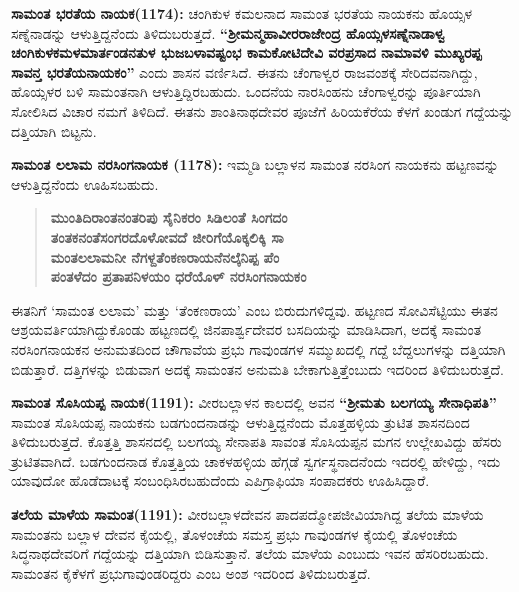 \textbf{ಸಾಮಂತ ಭರತೆಯ ನಾಯಕ(1174):} ಚಂಗಿಕುಳ ಕಮಲನಾದ ಸಾಮಂತ ಭರತೆಯ ನಾಯಕನು ಹೊಯ್ಸಳ ಸಣ್ನೆನಾಡನ್ನು ಆಳುತ್ತಿದ್ದನೆಂದು ತಿಳಿದುಬರುತ್ತದೆ. \textbf{“ಶ‍್ರೀಮನ್ಮಹಾವೀರರಾಜೇಂದ್ರ ಹೊಯ್ಸಳಸಣ್ನೆನಾಡಾಳ್ವ ಚಂಗಿಕುಳಕಮಳಮಾರ್ತಂಡನತುಳ ಭುಜಬಳಾವಷ್ಟಂಭ ಕಾಮಕೋಟಿದೇವಿ ವರಪ್ರಸಾದ ನಾಮಾವಳಿ ಮುಖ್ಯರಪ್ಪ ಸಾವನ್ತ ಭರತೆಯನಾಯಕಂ”} ಎಂದು ಶಾಸನ ವರ್ಣಿಸಿದೆ. ಈತನು ಚೆಂಗಾಳ್ವರ ರಾಜವಂಶಕ್ಕೆ ಸೇರಿದವನಾಗಿದ್ದು, ಹೊಯ್ಸಳರ ಬಳಿ ಸಾಮಂತನಾಗಿ ಆಳುತ್ತಿದ್ದಿರಬಹುದು. ಒಂದನೆಯ ನಾರಸಿಂಹನು ಚೆಂಗಾಳ್ವರನ್ನು ಪೂರ್ತಿಯಾಗಿ ಸೋಲಿಸಿದ ವಿಚಾರ ನಮಗೆ ತಿಳಿದಿದೆ. ಈತನು ಶಾಂತಿನಾಥದೇವರ ಪೂಜೆಗೆ ಹಿರಿಯಕೆರೆಯ ಕೆಳಗೆ ಖಂಡುಗ ಗದ್ದೆಯನ್ನು ದತ್ತಿಯಾಗಿ ಬಿಟ್ಟನು.

\textbf{ಸಾಮಂತ ಲಲಾಮ ನರಸಿಂಗನಾಯಕ (1178):} ಇಮ್ಮಡಿ ಬಲ್ಲಾಳನ ಸಾಮಂತ ನರಸಿಂಗ ನಾಯಕನು ಹಟ್ಟಣವನ್ನು ಆಳುತ್ತಿದ್ದನೆಂದು ಊಹಿಸಬಹುದು.

\begin{verse}
\textbf{ಮುಂತಿದಿರಾಂತನಂತರಿಪು ಸೈನಿಕರಂ ಸಿಡಿಲಂತೆ ಸಿಂಗದಂ} \\\textbf{ತಂತಕನಂತೆಸಂಗರದೊಳೋವದೆ ಜೀರಿಗೆಯೊಕ್ಕಲಿಕ್ಕಿ ಸಾ} \\\textbf{ಮಂತಲಲಾಮನೀ ನೆಗಳ್ದತೆಂಕಣರಾಯನೆನಲ್ಕೆನಿಪ್ಪ ಪೆಂ} \\\textbf{ಪಂತಳೆದಂ ಪ್ರತಾಪನಿಳಯಂ ಧರೆಯೊಳ್​ ನರಸಿಂಗನಾಯಕಂ}
\end{verse}

ಈತನಿಗೆ ‘ಸಾಮಂತ ಲಲಾಮ’ ಮತ್ತು ‘ತೆಂಕಣರಾಯ’ ಎಂಬ ಬಿರುದುಗಳಿದ್ದವು. ಹಟ್ಟಣದ ಸೋವಿಸೆಟ್ಟಿಯು ಈತನ ಆಶ್ರಯವರ್ತಿಯಾಗಿದ್ದುಕೊಂಡು ಹಟ್ಟಣದಲ್ಲಿ ಜಿನಪಾರ್ಶ್ವದೇವರ ಬಸದಿಯನ್ನು ಮಾಡಿಸಿದಾಗ, ಅದಕ್ಕೆ ಸಾಮಂತ ನರಸಿಂಗನಾಯಕನ ಅನುಮತದಿಂದ ಚೌಗಾವೆಯ ಪ್ರಭು ಗಾವುಂಡಗಳ ಸಮ್ಮುಖದಲ್ಲಿ ಗದ್ದೆ ಬೆದ್ದಲುಗಳನ್ನು ದತ್ತಿಯಾಗಿ ಬಿಡುತ್ತಾರೆ. ದತ್ತಿಗಳನ್ನು ಬಿಡುವಾಗ ಅದಕ್ಕೆ ಸಾಮಂತನ ಅನುಮತಿ ಬೇಕಾಗುತ್ತಿತ್ತೆಂಬುದು ಇದರಿಂದ ತಿಳಿದುಬರುತ್ತದೆ.

\textbf{ಸಾಮಂತ ಸೊಸಿಯಪ್ಪ ನಾಯಕ(1191):} ವೀರಬಲ್ಲಾಳನ ಕಾಲದಲ್ಲಿ ಅವನ \textbf{“ಶ‍್ರೀಮತು ಬಲಗಯ್ಯ ಸೇನಾಧಿಪತಿ”} ಸಾಮಂತ ಸೊಸಿಯಪ್ಪ ನಾಯಕನು ಬಡಗುಂದನಾಡನ್ನು ಆಳುತ್ತಿದ್ದನೆಂದು ಮೊತ್ತಹಳ್ಳಿಯ ತ್ರುಟಿತ ಶಾಸನದಿಂದ ತಿಳಿದು\-ಬರುತ್ತದೆ. ಕೊತ್ತತ್ತಿ ಶಾಸನದಲ್ಲಿ ಬಲಗಯ್ಯ ಸೇನಾಪತಿ ಸಾವಂತ ಸೊಸಿಯಪ್ಪನ ಮಗನ ಉಲ್ಲೇಖವಿದ್ದು ಹೆಸರು ತ್ರುಟಿತವಾಗಿದೆ. ಬಡಗುಂದನಾಡ ಕೊತ್ತತ್ತಿಯ ಚಾಕಳಹಳ್ಳಿಯ ಹೆಗ್ಗಡೆ ಸ್ವರ್ಗಸ್ಥನಾದನೆಂದು ಇದರಲ್ಲಿ ಹೇಳಿದ್ದು, ಇದು ಯಾವುದೋ ಹೊಡೆದಾಟಕ್ಕೆ ಸಂಬಂಧಿಸಿರಬಹುದೆಂದು ಎಪಿಗ್ರಾಫಿಯಾ ಸಂಪಾದಕರು ಊಹಿಸಿದ್ದಾರೆ.

\textbf{ತಲೆಯ ಮಾಳೆಯ ಸಾಮಂತ(1191):} ವೀರಬಲ್ಲಾಳದೇವನ ಪಾದಪದ್ಮೋಪಜೀವಿಯಾಗಿದ್ದ ತಲೆಯ ಮಾಳೆಯ ಸಾಮಂತನು ಬಲ್ಲಾಳ ದೇವನ ಕೈಯಲ್ಲಿ, ತೊಳಂಚೆಯ ಸಮಸ್ತ ಪ್ರಭು ಗಾವುಂಡಗಳ ಕೈಯಲ್ಲಿ ತೊಳಂಚೆಯ ಸಿದ್ಧನಾಥದೇವರಿಗೆ ಗದ್ದೆಯನ್ನು ದತ್ತಿಯಾಗಿ ಬಿಡಿಸುತ್ತಾನೆ. ತಲೆಯ ಮಾಳೆಯ ಎಂಬುದು ಇವನ ಹೆಸರಿರಬಹುದು. ಸಾಮಂತನ ಕೈಕೆಳಗೆ ಪ್ರಭುಗಾವುಂಡರಿದ್ದರು ಎಂಬ ಅಂಶ ಇದರಿಂದ ತಿಳಿದುಬರುತ್ತದೆ.

